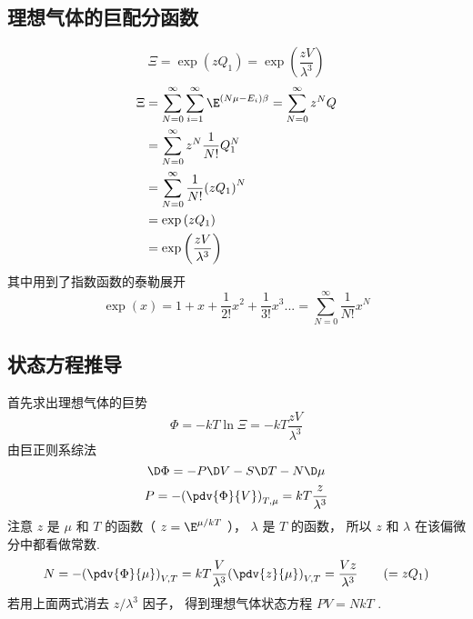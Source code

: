 
\subsection{理想气体的巨配分函数}
\noindent{}
\begin{equation}\label{IdMCE_eq1}
\Xi  = \exp \left( {z{Q_1}} \right) = \exp \left( {\frac{zV}{\lambda ^3}} \right)
\end{equation}
\begin{equation}\label{IdMCE_eq2}
\begin{aligned}
\Xi & = \sum\limits_{N = 0}^\infty  {\sum\limits_{i = 1}^\infty  {\E^{\left( {N\mu  - {E_i}} \right)\beta }} }  = \sum\limits_{N = 0}^\infty  {{z^N}Q} \\
& = \sum\limits_{N = 0}^\infty  {{z^N}\frac{1}{N!}Q_1^N} \\
& = \sum\limits_{N = 0}^\infty  {\frac{1}{N!}{{\left( {z{Q_1}} \right)}^N}} \\
& = \exp \left( {z{Q_1}} \right) \\
& = \exp \left( {\frac{zV}{\lambda ^3}} \right){\kern 1pt} {\kern 1pt} {\kern 1pt} {\kern 1pt} {\kern 1pt} {\kern 1pt} {\kern 1pt}
\end{aligned}
\end{equation}
其中用到了指数函数的泰勒展开%
\begin{equation}\label{IdMCE_eq3}
\exp \left( x \right) = 1 + x + \frac{1}{2!}{x^2} + \frac{1}{3!}{x^3}... = \sum\limits_{N = 0}^\infty  {\frac{1}{N!}{x^N}}
\end{equation}

\subsection{状态方程推导}
首先求出理想气体的巨势
\begin{equation}\label{IdMCE_eq4}
\Phi  =  - kT\ln \Xi  =  - kT\frac{zV}{\lambda ^3}
\end{equation}
由巨正则系综法%
\begin{equation}\label{IdMCE_eq5}
\D \Phi  =  - P \D V - S \D T - N \D \mu
\end{equation}
\begin{equation}\label{IdMCE_eq6}
P =  - {\left( {\pdv{\Phi}{V}} \right)_{T,\mu }} = kT\frac{z}{\lambda ^3}
\end{equation}
注意 $z$ 是 $\mu $ 和 $T$ 的函数（ $z = {\E^{{\mu }/{kT}}}$ ）， $\lambda $ 是 $T$ 的函数， 所以 $z$ 和 $\lambda $ 在该偏微分中都看做常数.
\begin{equation}\label{IdMCE_eq7}
N =  - {\left( {\pdv{\Phi}{\mu}} \right)_{V,T}} = kT\frac{V}{\lambda ^3}{\left( {\pdv{z}{\mu}} \right)_{V,T}} = \frac{Vz}{\lambda ^3} 
\qquad
( = z{Q_1})
\end{equation}
若用上面两式消去 ${z}/{\lambda ^3}$ 因子， 得到理想气体状态方程 $PV = NkT$ .
  
